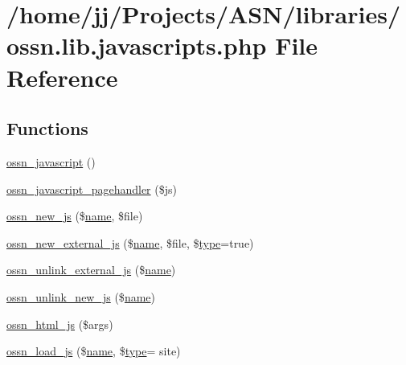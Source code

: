 \hypertarget{ossn_8lib_8javascripts_8php}{}\section{/home/jj/\+Projects/\+A\+S\+N/libraries/ossn.lib.\+javascripts.\+php File Reference}
\label{ossn_8lib_8javascripts_8php}
\subsection*{Functions}
\begin{DoxyCompactItemize}
\item 
\hyperlink{ossn_8lib_8javascripts_8php_a93f13a6610391ab4ff3f7dbb7495d8d7}{ossn\+\_\+javascript} ()
\item 
\hyperlink{ossn_8lib_8javascripts_8php_aed9259025ff54df379a2d4ea0a806587}{ossn\+\_\+javascript\+\_\+pagehandler} (\$js)
\item 
\hyperlink{ossn_8lib_8javascripts_8php_a31668f24958b7fb849b4442fdfa5d8fc}{ossn\+\_\+new\+\_\+js} (\$\hyperlink{user_8php_a765af5e9671743530143a6d3670fd9a6}{name}, \$file)
\item 
\hyperlink{ossn_8lib_8javascripts_8php_a64b7f5594696434be49ffafa3ddca9b7}{ossn\+\_\+new\+\_\+external\+\_\+js} (\$\hyperlink{user_8php_a765af5e9671743530143a6d3670fd9a6}{name}, \$file, \$\hyperlink{_ossn_wall_2actions_2wall_2post_2group_8php_a2dc1bb4e1ed0029daa81ac0776b14b51}{type}=true)
\item 
\hyperlink{ossn_8lib_8javascripts_8php_ae425818c423bbc9fc8b14bf9eafe74fa}{ossn\+\_\+unlink\+\_\+external\+\_\+js} (\$\hyperlink{user_8php_a765af5e9671743530143a6d3670fd9a6}{name})
\item 
\hyperlink{ossn_8lib_8javascripts_8php_a60ac3f7cac3ae473d7faeff8ad43a377}{ossn\+\_\+unlink\+\_\+new\+\_\+js} (\$\hyperlink{user_8php_a765af5e9671743530143a6d3670fd9a6}{name})
\item 
\hyperlink{ossn_8lib_8javascripts_8php_a0ed3b495463d20b1a0479932a3b84fcc}{ossn\+\_\+html\+\_\+js} (\$args)
\item 
\hyperlink{ossn_8lib_8javascripts_8php_a2885bdb3418b32c3c26abf3ded22d769}{ossn\+\_\+load\+\_\+js} (\$\hyperlink{user_8php_a765af5e9671743530143a6d3670fd9a6}{name}, \$\hyperlink{_ossn_wall_2actions_2wall_2post_2group_8php_a2dc1bb4e1ed0029daa81ac0776b14b51}{type}= \textquotesingle{}site\textquotesingle{})
\item 

\end{DoxyCompactItemize}
